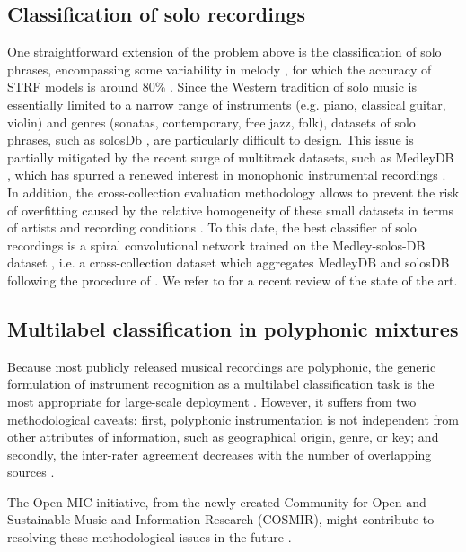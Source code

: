 \documentclass{article}
\makeatletter
\newcommand*{\eg}{e.g.\@\xspace}
\newcommand*{\ie}{i.e.\@\xspace}
\makeatother
\begin{document}
\subsection{Classification of solo recordings}
One straightforward extension of the problem above is the classification of solo phrases, encompassing some variability in melody \cite{krishna2004icassp}, for which the accuracy of STRF models is around $80\%$ \cite{patil2015eurasip}.
Since the Western tradition of solo music is essentially limited to a narrow range of instruments (\eg{} piano, classical guitar, violin) and genres (sonatas, contemporary, free jazz, folk), datasets of solo phrases, such as solosDb \cite{joder2009taslp}, are particularly difficult to design.
This issue is partially mitigated by the recent surge of multitrack datasets, such as MedleyDB \cite{bittner2014ismir}, which has spurred a renewed interest in monophonic instrumental recordings \cite{yip2017ismir}.
In addition, the cross-collection evaluation methodology \cite{livshin2003ismir} allows to prevent the risk of overfitting caused by the relative homogeneity of these small datasets in terms of artists and recording conditions \cite{bogdanov2016ismir}.
To this date, the best classifier of solo recordings is a spiral convolutional network \cite{lostanlen2016ismir} trained on the Medley-solos-DB dataset \cite{lostanlen2018msdb}, \ie{} a cross-collection dataset which aggregates MedleyDB and solosDB following the procedure of \cite{donnelly2015icdmw}.
We refer to \cite{han2017taslp} for a recent review of the state of the art.

\subsection{Multilabel classification in polyphonic mixtures}
Because most publicly released musical recordings are polyphonic, the generic formulation of instrument recognition as a multilabel classification task is the most appropriate for large-scale deployment \cite{martins2007ismir,burred2009icassp}.
However, it suffers from two methodological caveats: first, polyphonic instrumentation is not independent from other attributes of information, such as geographical origin, genre, or key; and secondly, the inter-rater agreement decreases with the number of overlapping sources \cite{fuhrmann2012phd}.


The Open-MIC initiative, from the newly created Community for Open and Sustainable Music and Information Research (COSMIR), might contribute to resolving these methodological issues in the future \cite{mcfee2016ismir}.
\end{document}
